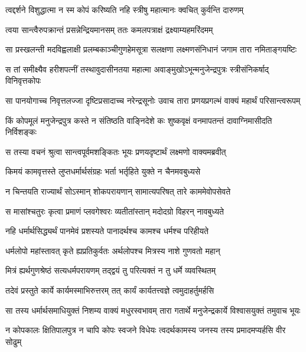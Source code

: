 \twolineshloka
{त्वद्दर्शने विशुद्धात्मा न स्म कोपं करिष्यति}
{नहि स्त्रीषु महात्मानः क्वचित् कुर्वन्ति दारुणम्} %

\twolineshloka
{त्वया सान्त्वैरुपक्रान्तं प्रसन्नेन्द्रियमानसम्}
{ततः कमलपत्राक्षं द्रक्ष्याम्यहमरिंदमम्} %

\twolineshloka
{सा प्रस्खलन्ती मदविह्वलाक्षी प्रलम्बकाञ्चीगुणहेमसूत्रा}
{सलक्षणा लक्ष्मणसंनिधानं जगाम तारा नमिताङ्गयष्टिः} %

\twolineshloka
{स तां समीक्ष्यैव हरीशपत्नीं तस्थावुदासीनतया महात्मा}
{अवाङ्मुखोऽभून्मनुजेन्द्रपुत्रः स्त्रीसंनिकर्षाद् विनिवृत्तकोपः} %

\twolineshloka
{सा पानयोगाच्च निवृत्तलज्जा दृष्टिप्रसादाच्च नरेन्द्रसूनोः}
{उवाच तारा प्रणयप्रगल्भं वाक्यं महार्थं परिसान्त्वरूपम्} %

\twolineshloka
{किं कोपमूलं मनुजेन्द्रपुत्र कस्ते न संतिष्ठति वाङ्निदेशे}
{कः शुष्कवृक्षं वनमापतन्तं दावाग्निमासीदति निर्विशङ्कः} %

\twolineshloka
{स तस्या वचनं श्रुत्वा सान्त्वपूर्वमशङ्कितः}
{भूयः प्रणयदृष्टार्थं लक्ष्मणो वाक्यमब्रवीत्} %

\twolineshloka
{किमयं कामवृत्तस्ते लुप्तधर्मार्थसंग्रहः}
{भर्ता भर्तृहिते युक्ते न चैनमवबुध्यसे} %

\twolineshloka
{न चिन्तयति राज्यार्थं सोऽस्मान् शोकपरायणान्}
{सामात्यपरिषत् तारे काममेवोपसेवते} %

\twolineshloka
{स मासांश्चतुरः कृत्वा प्रमाणं प्लवगेश्वरः}
{व्यतीतांस्तान् मदोदग्रो विहरन् नावबुध्यते} %

\twolineshloka
{नहि धर्मार्थसिद्ध्यर्थं पानमेवं प्रशस्यते}
{पानादर्थश्च कामश्च धर्मश्च परिहीयते} %

\twolineshloka
{धर्मलोपो महांस्तावत् कृते ह्यप्रतिकुर्वतः}
{अर्थलोपश्च मित्रस्य नाशे गुणवतो महान्} %

\twolineshloka
{मित्रं ह्यर्थगुणश्रेष्ठं सत्यधर्मपरायणम्}
{तद्द्वयं तु परित्यक्तं न तु धर्मे व्यवस्थितम्} %

\twolineshloka
{तदेवं प्रस्तुते कार्ये कार्यमस्माभिरुत्तरम्}
{तत् कार्यं कार्यतत्त्वज्ञे त्वमुदाहर्तुमर्हसि} %

\twolineshloka
{सा तस्य धर्मार्थसमाधियुक्तं निशम्य वाक्यं मधुरस्वभावम्}
{तारा गतार्थे मनुजेन्द्रकार्ये विश्वासयुक्तं तमुवाच भूयः} %

\twolineshloka
{न कोपकालः क्षितिपालपुत्र न चापि कोपः स्वजने विधेयः}
{त्वदर्थकामस्य जनस्य तस्य प्रमादमप्यर्हसि वीर सोढुम्} %

